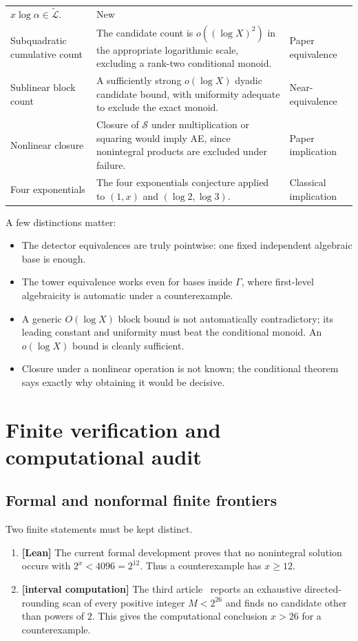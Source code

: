 \documentclass[11pt,oneside]{article}
\theoremstyle{definition}
\theoremstyle{remark}
\newcommand{\Sol}{\mathcal S}
\newcommand{\LL}{\widetilde{\mathcal L}}
\newcommand{\statuslean}{\textcolor{LeanBlue}{\textbf{[Lean]}}}
\newcommand{\statuscomp}{\textcolor{ComputeOrange}{\textbf{[interval computation]}}}
\begin{document}
\begin{longtable}{@{}>{\raggedright\arraybackslash}p{}>{\raggedright\arraybackslash}p{}>{\raggedright\arraybackslash}p{}@{}}
$x\log\alpha\in\LL$. & New \\
Subquadratic cumulative count & The candidate count is $o((\log X)^2)$ in the appropriate
logarithmic scale, excluding a rank-two conditional monoid. & Paper equivalence \\
Sublinear block count & A sufficiently strong $o(\log X)$ dyadic candidate bound, with
uniformity adequate to exclude the exact monoid. & Near-equivalence \\
Nonlinear closure & Closure of $\Sol$ under multiplication or squaring would imply AE, since
nonintegral products are excluded under failure. & Paper implication \\
Four exponentials & The four exponentials conjecture applied to $(1,x)$ and
$(\log2,\log3)$. & Classical implication \\
\bottomrule
\end{longtable}

A few distinctions matter:

\begin{itemize}
\item The detector equivalences are truly pointwise: one fixed independent algebraic base is
enough.
\item The tower equivalence works even for bases inside $\Gamma$, where first-level
algebraicity is automatic under a counterexample.
\item A generic $O(\log X)$ block bound is not automatically contradictory; its leading
constant and uniformity must beat the conditional monoid.  An $o(\log X)$ bound is cleanly
sufficient.
\item Closure under a nonlinear operation is not known; the conditional theorem says exactly
why obtaining it would be decisive.
\end{itemize}

\section{Finite verification and computational audit}\label{sec:computation}

\subsection{Formal and nonformal finite frontiers}

Two finite statements must be kept distinct.

\begin{enumerate}
\item \statuslean{} The current formal development proves that no nonintegral solution occurs
      with $2^x<4096=2^{12}$.  Thus a counterexample has $x\ge12$.
\item \statuscomp{} The third article~\cite{ProveItReport3} reports an exhaustive directed-rounding scan of every
      positive integer $M<2^{26}$ and finds no candidate other than powers of $2$.  This gives
      the computational conclusion $x>26$ for a counterexample.
\end{enumerate}
\end{document}
